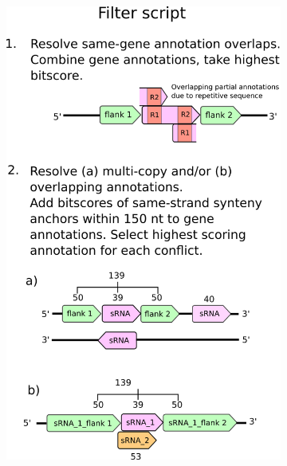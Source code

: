 \begin{figure}[H]
\begin{subfigure}{0.49\textwidth}
\includegraphics[scale=1.1]{sal/filter_flowchart.png}
\end{subfigure}

\end{figure}
